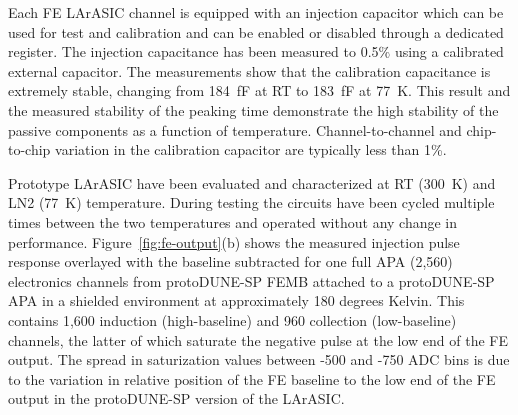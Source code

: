 Each FE LArASIC channel is equipped with an injection capacitor which can be used
for test and calibration and can be enabled or disabled through a
dedicated register. The injection capacitance has been measured to 0.5$\%$ using 
a calibrated external capacitor. The measurements show
that the calibration capacitance is extremely stable, changing from
184~fF at RT to 183~fF at 77~K. This result and the measured
stability of the peaking time demonstrate the high stability of the
passive components as a function of temperature. Channel-to-channel and chip-to-chip
variation in the calibration capacitor are typically less than 1\%. 

Prototype LArASIC have been evaluated and characterized at RT (300~K) and LN2 (77~K) temperature.
During testing the circuits have been cycled multiple times
between the two temperatures and operated without any change in performance.
Figure~\ref{fig:fe-output}(b) shows the measured injection pulse response overlayed with the baseline subtracted for one full APA 
(2,560) electronics channels from protoDUNE-SP FEMB attached to a protoDUNE-SP APA in a 
shielded environment at approximately 180 degrees Kelvin. This contains 1,600 induction (high-baseline)
and 960 collection (low-baseline) channels, the latter of which saturate the negative pulse at the low 
end of the FE output. The spread in saturization values between -500 and -750 ADC bins is due to the
variation in relative position of the FE baseline to the low end of the FE output 
in the protoDUNE-SP version of the LArASIC.



